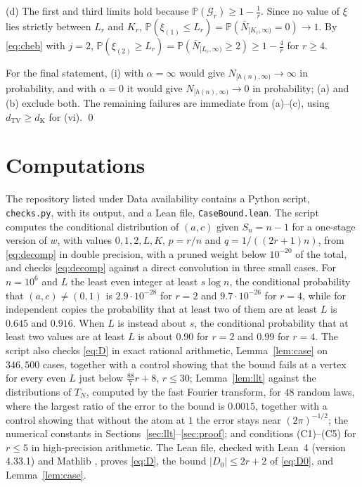 \documentclass[11pt]{amsart}
\numberwithin{equation}{section}
\newcommand{\Pp}{\mathbb P}
\newcommand{\cG}{\mathcal G}
\newcommand{\Nb}{\overline N}
\newcommand{\dK}{d_{\mathrm K}}
\newcommand{\dTV}{d_{\mathrm{TV}}}
\begin{document}
(d) The first and third limits hold because $\Pp(\cG_r)\ge1-\frac1r$. Since no value of $\xi$ lies strictly between $L_r$ and $K_r$, $\Pp(\xi_{(1)}\le L_r)=\Pp(\Nb_{[K_r,\infty)}=0)\to1$. By \eqref{eq:cheb} with $j=2$, $\Pp(\xi_{(2)}\ge L_r)=\Pp(\Nb_{[L_r,\infty)}\ge2)\ge1-\frac4r$ for $r\ge4$.

For the final statement, (i) with $\alpha=\infty$ would give $N_{[h(n),\infty)}\to\infty$ in probability, and with $\alpha=0$ it would give $N_{[h(n),\infty)}\to0$ in probability; (a) and (b) exclude both. The remaining failures are immediate from (a)--(c), using $\dTV\ge\dK$ \cite[Lemma~19.5]{J12} for (vi). \qed

\section{Computations}\label{sec:checks}

The repository listed under Data availability contains a Python script, \texttt{checks.py}, with its output, and a Lean file, \texttt{CaseBound.lean}. The script computes the conditional distribution of $(a,c)$ given $S_n=n-1$ for a one-stage version of $w$, with values $0,1,2,L,K$, $p=r/n$ and $q=1/((2r+1)n)$, from \eqref{eq:decomp} in double precision, with a pruned weight below $10^{-20}$ of the total, and checks \eqref{eq:decomp} against a direct convolution in three small cases. For $n=10^6$ and $L$ the least even integer at least $s\log n$, the conditional probability that $(a,c)\ne(0,1)$ is $2.9\cdot10^{-28}$ for $r=2$ and $9.7\cdot10^{-26}$ for $r=4$, while for independent copies the probability that at least two of them are at least $L$ is $0.645$ and $0.916$. When $L$ is instead about $s$, the conditional probability that at least two values are at least $L$ is about $0.90$ for $r=2$ and $0.99$ for $r=4$. The script also checks \eqref{eq:D} in exact rational arithmetic, Lemma~\ref{lem:case} on $346{,}500$ cases, together with a control showing that the bound fails at a vertex for every even $L$ just below $\frac{88}7r+8$, $r\le30$; Lemma~\ref{lem:llt} against the distributions of $T_N$, computed by the fast Fourier transform, for $48$ random laws, where the largest ratio of the error to the bound is $0.0015$, together with a control showing that without the atom at $1$ the error stays near $(2\pi)^{-1/2}$; the numerical constants in Sections~\ref{sec:llt}--\ref{sec:proof}; and conditions (C1)--(C5) for $r\le5$ in high-precision arithmetic. The Lean file, checked with Lean~4 \cite{MU21} (version 4.33.1) and Mathlib \cite{Mathlib20}, proves \eqref{eq:D}, the bound $|D_0|\le2r+2$ of \eqref{eq:D0}, and Lemma~\ref{lem:case}.
\end{document}
